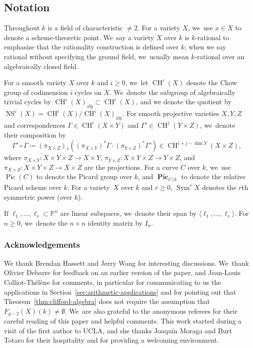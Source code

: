 \documentclass[JEP,XML,SOM,Unicode,NoEqCountersInSection,published]{cedram}
\let\bb\mathbb\let\Bbb\mathbb
\theoremstyle{plain}
\theoremstyle{definition}
\DeclareMathOperator{\alg}{alg}
\DeclareMathOperator{\CH}{CH}
\DeclareMathOperator{\NS}{NS}
\DeclareMathOperator{\Pic}{Pic}
\DeclareMathOperator{\bPic}{\mathbf{Pic}}
\DeclareMathOperator{\Sym}{Sym}
\newcommand{\kbar}{{\overline{k}}}
\begin{document}
\subsection*{Notation}
Throughout \(k\) is a field of characteristic \(\neq 2\). For a variety \(X\), we~use \(x\in X\) to denote a scheme-theoretic point. We~say a variety \(X\) over \(k\) is \(k\)-rational to emphasize that the rationality construction is defined over \(k\); when we say rational without specifying the ground field, we~usually mean \(\kbar\)-rational over an algebraically closed field.

For a smooth variety $X$ over \(k\) and
\(i\geq 0\), we~let \(\CH^i(X)\) denote the Chow group of codimension \(i\) cycles on \(X\). We~denote the subgroup of algebraically trivial cycles by \(\CH^i(X)_{\alg} \subset \CH^i(X)\), and we denote the quotient by \(\NS^i(X) = \CH^i(X)/\CH^i(X)_{\alg}\).
For smooth projective varieties $X,Y, Z$ and correspondences $\Gamma\in \CH^i(X\times Y)$ and $\Gamma' \in \CH^j(Y\times Z)$, we~denote their composition by
\[
\Gamma'\circ\Gamma \coloneqq (\pi_{X\times Z})_*((\pi_{X\times Y})^*\Gamma\cdot (\pi_{Y\times Z})^*\Gamma')\in \CH^{i+j-\dim Y}(X\times Z),
\]
where $\pi_{X\times Y}\colon X\times Y\times Z\to X\times Y$, $\pi_{Y\times Z}\colon X\times Y\times Z\to Y\times Z$, and $\pi_{X\times Z}\colon X\times Y\times Z\to X\times Z$ are the projections.
For a curve \(C\) over \(k\), we~use \(\Pic(C)\) to denote the Picard group over \(k\), and \(\bPic_{C/k}\) to denote the relative Picard scheme over \(k\).
For a variety~\(X\) over \(k\) and \(r\geq 0\), \(\Sym^r X\) denotes the \(r\)th symmetric power (over \(k\)).

If \(\ell_1, \ldots, \ell_{r} \subset \bb P^n\) are linear subspaces, we~denote their span by \(\langle \ell_1, \ldots, \ell_r\rangle\).
For $n\geq 0$, we~denote the $n\times n$ identity matrix by $I_n$.

\subsubsection*{Acknowledgements}
We thank Brendan Hassett and Jerry Wang for interesting discussions. We~thank Olivier Debarre for feedback
on an earlier version of the paper,
and Jean-Louis Colliot-Thélène for comments, in particular for communicating to us the applications in Section~\ref{sec:arithmetic-applications} and for pointing out that Theorem~\ref{thm:clifford-algebra} does not require the assumption that \(F_{g-2}(X)(k)\neq\emptyset\). We~are also grateful to the anonymous referees for their careful reading of this paper and helpful comments.
This work started during a visit of the first author to UCLA, and she thanks Joaquín Moraga and Burt Totaro for their hospitality and for providing a welcoming environment.
\end{document}

